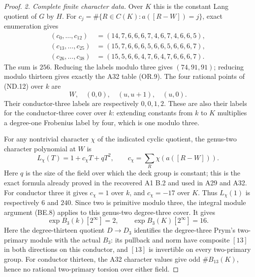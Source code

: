 \begin{proof}
\emph{2. Complete finite character data.}
Over $K$ this is the constant Lang quotient of $G$ by $H$.
For $c_j=\#\{R\in C(K):a([R-W])=j\}$, exact enumeration gives
\[
\begin{aligned}
 (c_0,\ldots,c_{12})&=(14,7,6,6,6,7,4,6,7,4,6,6,5),\\
 (c_{13},\ldots,c_{25})&=(15,7,6,6,6,5,6,6,5,6,6,6,7),\\
 (c_{26},\ldots,c_{38})&=(15,5,6,6,4,7,6,4,7,6,6,6,7).
\end{aligned}
 \tag{ND.17}
\]
The sum is $256$. Reducing the labels modulo three gives
$(74,91,91)$; reducing modulo thirteen gives exactly the A32
table (OR.9). The four rational points of (ND.12) over $k$ are
\[
              W,\quad(0,0),\quad(u,u+1),\quad(u,0).
\]
Their conductor-three labels are respectively $0,0,1,2$.
These are also their labels for the conductor-three cover
over $k$: extending constants from $k$ to $K$ multiplies a
degree-one Frobenius label by four, which is one modulo three.

For any nontrivial character $\chi$ of the indicated cyclic
quotient, the genus-two character polynomial at $W$ is
\[
         L_\chi(T)=1+c_\chi T+qT^2,
             \qquad c_\chi=\sum_R\chi(a([R-W])).
 \tag{ND.18}
\]
Here $q$ is the size of the field over which the deck group is
constant; this is the exact formula already proved in the
recovered A1 B.2 and used in A29 and A32. For conductor three
it gives $c_\chi=1$ over $k$, and $c_\chi=-17$ over $K$.
Thus $L_\chi(1)$ is respectively $6$ and $240$.
Since two is primitive modulo three, the integral module
argument (BE.8) applies to this genus-two degree-three cover.
It gives
\[
              \exp B_3(k)[2^\infty]=2,
                 \qquad \exp B_3(K)[2^\infty]=16.
 \tag{ND.19}
\]
Here the degree-thirteen quotient $D\to D_3$ identifies the
degree-three Prym's two-primary module with the actual $B_3$:
its pullback and norm have composite $[13]$ in both directions
on this conductor, and $[13]$ is invertible on every two-primary
group.
For conductor thirteen, the A32 character values give odd
$\#B_{13}(K)$, hence no rational two-primary torsion over
either field.


\end{proof}
